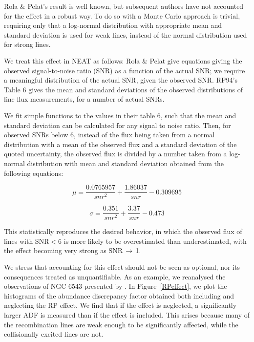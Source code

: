 \documentclass[useAMS,usenatbib]{mn2e}
\begin{document}
Rola \& Pelat's result is well known, but subsequent authors have not accounted for the effect in a robust way.  To do so with a Monte Carlo approach is trivial, requiring only that a log-normal distribution with appropriate mean and standard deviation is used for weak lines, instead of the normal distribution used for strong lines.

We treat this effect in NEAT as follows: Rola \& Pelat give equations giving the observed signal-to-noise ratio (SNR) as a function of the actual SNR; we require a meaningful distribution of the actual SNR, given the observed SNR.  RP94's Table 6 gives the mean and standard deviations of the observed distributions of line flux measurements, for a number of actual SNRs.

We fit simple functions to the values in their table 6, such that the mean and standard deviation can be calculated for any signal to noise ratio.  Then, for observed SNRs below 6, instead of the flux being taken from a normal distribution with a mean of the observed flux and a standard deviation of the quoted uncertainty, the observed flux is divided by a number taken from a log-normal distribution with mean and standard deviation obtained from the following equations:

\begin{equation}
\mu = \frac{0.0765957}{snr^2} + \frac{1.86037}{snr} - 0.309695
\end{equation}

\begin{equation}
\sigma = \frac{0.351}{snr^2} + \frac{3.37}{snr} - 0.473
\end{equation}

This statistically reproduces the desired behavior, in which the observed flux of lines with SNR$<$6 is more likely to be overestimated than underestimated, with the effect becoming very strong as SNR\,$\to$\,1.

We stress that accounting for this effect should not be seen as optional, nor its consequences treated as unquantifiable.  As an example, we reanalysed the observations of NGC 6543 presented by \citep{2004MNRAS.351.1026W}.  In Figure~\ref{RPeffect}, we plot the histograms of the abundance discrepancy factor obtained both including and neglecting the RP effect.  We find that if the effect is neglected, a significantly larger ADF is measured than if the effect is included.  This arises because many of the recombination lines are weak enough to be significantly affected, while the collisionally excited lines are not.
\end{document}
